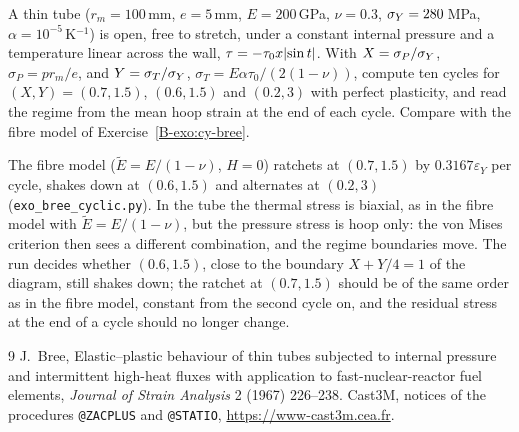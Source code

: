 \label{exo:cc-bree}
%
A thin tube ($r_m=100$\,mm, $e=5$\,mm, $E=200$\,GPa, $\nu=0.3$,
$\sigma_{Y}=280$\,MPa, $\alpha=10^{-5}$\,K$^{-1}$) is open, free to stretch, under a
constant internal pressure and a temperature linear across the wall,
$\tau=-\tau_0x\lvert \sin t\rvert$. With $X=\sigma_P/\sigma_{Y}$, $\sigma_P=pr_m/e$, and
$Y=\sigma_T/\sigma_{Y}$, $\sigma_T=E\alpha\tau_0/(2(1-\nu))$, compute ten cycles for
$(X,Y)=(0.7,1.5)$, $(0.6,1.5)$ and $(0.2,3)$ with perfect plasticity, and
read the regime from the mean hoop strain at the end of each cycle. Compare
with the fibre model of Exercise~\ref{B-exo:cy-bree}.
\begin{solution}
The fibre model ($\tilde E=E/(1-\nu)$, $H=0$) ratchets at $(0.7,1.5)$ by
$0.3167\varepsilon_Y$ per cycle, shakes down at $(0.6,1.5)$ and alternates at
$(0.2,3)$ (\texttt{exo\_bree\_cyclic.py}). In the tube the thermal stress is
biaxial, as in the fibre model with $\tilde E=E/(1-\nu)$, but the pressure
stress is hoop only: the von Mises criterion then sees a different
combination, and the regime boundaries move. The run decides whether
$(0.6,1.5)$, close to the boundary $X+Y/4=1$ of the diagram, still shakes
down; the ratchet at $(0.7,1.5)$ should be of the same order as in the fibre
model, constant from the second cycle on, and the residual stress at the end
of a cycle should no longer change.

\end{solution}

\begin{chapterbib}{9}
 J.~Bree, Elastic--plastic behaviour of thin tubes
  subjected to internal pressure and intermittent high-heat fluxes with
  application to fast-nuclear-reactor fuel elements, \emph{Journal of Strain
  Analysis} 2 (1967) 226--238.
 Cast3M, notices of the procedures \texttt{@ZACPLUS}
  and \texttt{@STATIO}, \url{https://www-cast3m.cea.fr}.
\end{chapterbib}

